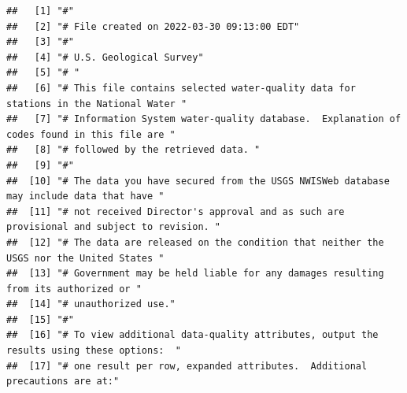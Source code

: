 \documentclass[
]{book}
\begin{document}
\begin{verbatim}
##   [1] "#"                                                                                                                                            
##   [2] "# File created on 2022-03-30 09:13:00 EDT"                                                                                                    
##   [3] "#"                                                                                                                                            
##   [4] "# U.S. Geological Survey"                                                                                                                     
##   [5] "# "                                                                                                                                           
##   [6] "# This file contains selected water-quality data for stations in the National Water "                                                         
##   [7] "# Information System water-quality database.  Explanation of codes found in this file are "                                                   
##   [8] "# followed by the retrieved data. "                                                                                                           
##   [9] "#"                                                                                                                                            
##  [10] "# The data you have secured from the USGS NWISWeb database may include data that have "                                                       
##  [11] "# not received Director's approval and as such are provisional and subject to revision. "                                                     
##  [12] "# The data are released on the condition that neither the USGS nor the United States "                                                        
##  [13] "# Government may be held liable for any damages resulting from its authorized or "                                                            
##  [14] "# unauthorized use."                                                                                                                          
##  [15] "#"                                                                                                                                            
##  [16] "# To view additional data-quality attributes, output the results using these options:  "                                                      
##  [17] "# one result per row, expanded attributes.  Additional precautions are at:"                                                                   

\end{verbatim}
\end{document}
